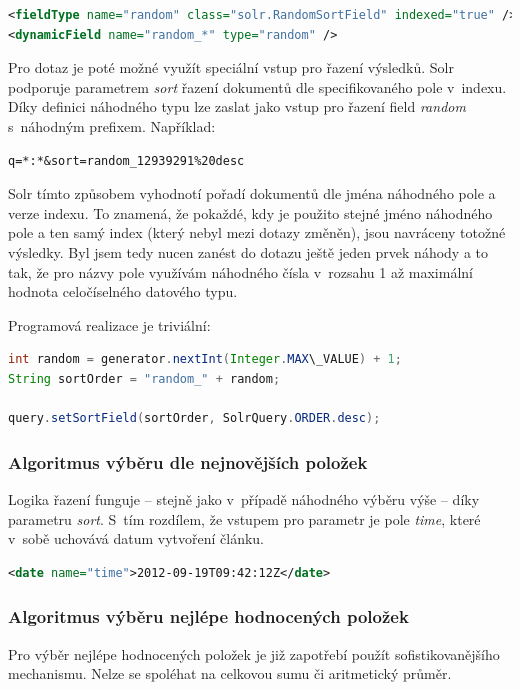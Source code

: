 \documentclass[thesis=M,czech]{FITthesis}[2014/05/07]
\begin{document}
\begin{lstlisting}[language=xml]
<fieldType name="random" class="solr.RandomSortField" indexed="true" />
<dynamicField name="random_*" type="random" />
\end{lstlisting}

Pro dotaz je poté možné využít speciální vstup pro řazení výsledků. Solr podporuje parametrem \emph{sort} řazení dokumentů dle specifikovaného pole v~indexu. Díky definici náhodného typu lze zaslat jako vstup pro řazení field \emph{random} s~náhodným prefixem. Například:

\begin{verbatim}
q=*:*&sort=random_12939291%20desc
\end{verbatim}

Solr tímto způsobem vyhodnotí pořadí dokumentů dle jména náhodného pole a verze indexu. To znamená, že pokaždé, kdy je použito stejné jméno náhodného pole a ten samý index (který nebyl mezi dotazy změněn), jsou navráceny totožné výsledky. Byl jsem tedy nucen zanést do dotazu ještě jeden prvek náhody a to tak, že pro názvy pole využívám náhodného čísla v~rozsahu 1 až maximální hodnota celočíselného datového typu.

Programová realizace je triviální:

\begin{lstlisting}[language=java]
int random = generator.nextInt(Integer.MAX\_VALUE) + 1;
String sortOrder = "random_" + random;
  
query.setSortField(sortOrder, SolrQuery.ORDER.desc);
\end{lstlisting}       

\subsubsection{Algoritmus výběru dle nejnovějších položek}
Logika řazení funguje – stejně jako v~případě náhodného výběru výše – díky parametru \emph{sort}. S~tím rozdílem, že vstupem pro parametr je pole \emph{time}, které v~sobě uchovává datum vytvoření článku.

\begin{lstlisting}[language=xml]
<date name="time">2012-09-19T09:42:12Z</date>
\end{lstlisting}

\subsubsection{Algoritmus výběru nejlépe hodnocených položek}
Pro výběr nejlépe hodnocených položek je již zapotřebí použít sofistikovanějšího mechanismu. Nelze se spoléhat na celkovou sumu či aritmetický průměr.
\end{document}
